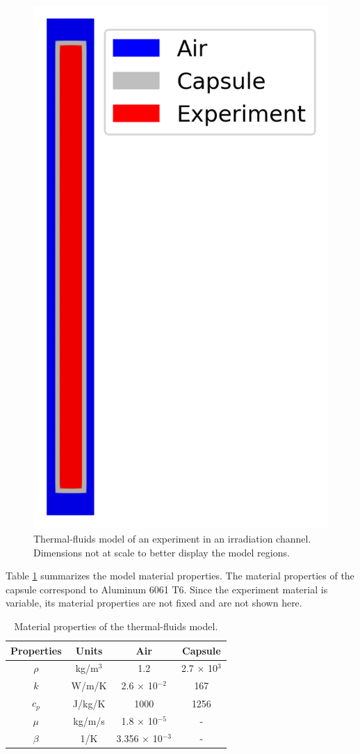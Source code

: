 \begin{figure}[htbp!] %
  \centering
  \includegraphics[width=0.2\linewidth]{figures/tf-geo}
  \caption{Thermal-fluids model of an experiment in an irradiation channel. Dimensions not at scale to better display the model regions.}
  \label{fig:thermal-model}
\end{figure}

Table \ref{tab:tf-mat} summarizes the model material properties.
The material properties of the capsule correspond to Aluminum 6061 T6.
Since the experiment material is variable, its material properties are not fixed and are not shown here.

\begin{table}[htbp!]
  \centering
  \caption{Material properties of the thermal-fluids model.}
  \label{tab:tf-mat}
  \begin{tabular}{cccc}
    \toprule
      Properties & Units & Air & Capsule \\
    \midrule
      $\rho$ & kg/m$^3$ & 1.2 & 2.7 $\times$ 10$^{3}$ \\
      $k$ & W/m/K & 2.6 $\times$ 10$^{-2}$ & 167 \\
      $c_p$ & J/kg/K & 1000 & 1256 \\
      $\mu$ & kg/m/s & 1.8 $\times$ 10$^{-5}$ & - \\
      $\beta$ & 1/K & 3.356 $\times$ 10$^{-3}$ & - \\
    \bottomrule
  \end{tabular}
\end{table}

